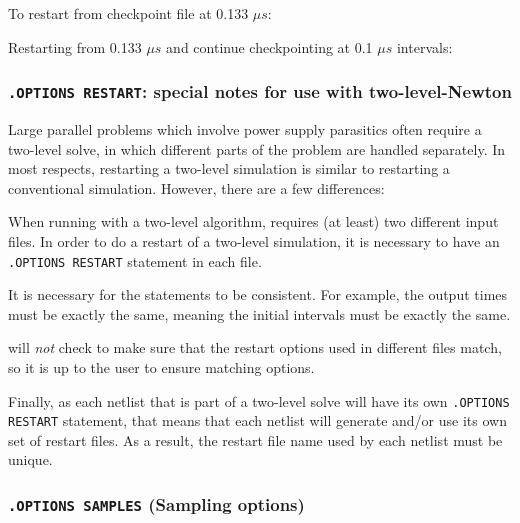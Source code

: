 To restart from checkpoint file at 0.133 $\mu s$:

Restarting from 0.133 $\mu s$ and continue checkpointing at 0.1 $\mu s$
intervals:

\subsubsection{\texttt{.OPTIONS RESTART}: special notes for use with two-level-Newton}

Large parallel problems which involve power supply parasitics often
require a two-level solve, in which different parts of the problem
are handled separately.  In most respects, restarting a two-level
simulation is similar to restarting a conventional simulation.
However, there are a few differences:

\begin{XyceItemize}
\item When running with a two-level algorithm, \Xyce{} requires (at least) two
different input files.  In order to do a restart of a two-level \Xyce{}
simulation, it is necessary to have an \texttt{.OPTIONS RESTART} statement
in each file.

\item It is necessary for the statements to be consistent.  For example,
the output times must be exactly the same, meaning the initial intervals
must be exactly the same.

\item \Xyce{} will \emph{not} check to make sure that the restart
options used in different files match, so it is up to the user to ensure
matching options.

\item Finally, as each netlist that is part of a two-level solve will have its
own \texttt{.OPTIONS RESTART} statement, that means that each netlist
will generate and/or use its own set of restart files.  As a result,
the restart file name used by each netlist must be unique.
\end{XyceItemize}

\subsubsection{\texttt{.OPTIONS SAMPLES} (Sampling options)}

